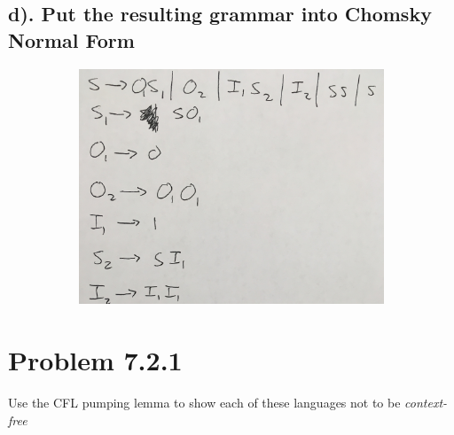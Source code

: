 \documentclass[20pt]{article} %
\begin{document}
\subsection{d). Put the resulting grammar into Chomsky Normal Form}
\begin{figure}[!htbp]
  	\centering
   	\begin{subfigure}[p]{0.5\linewidth}
    	\includegraphics[width=\linewidth]{./figures/h8-4.jpg}
   	\end{subfigure}
\end{figure}
\newpage
\section{Problem 7.2.1}
Use the CFL pumping lemma to show each of these languages not to be \textit{context-free}
\end{document}
